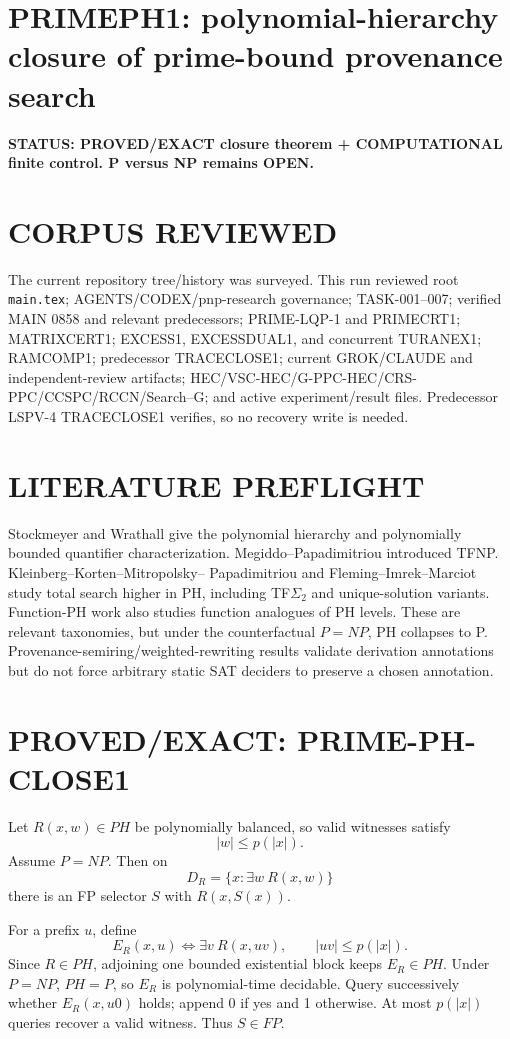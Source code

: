 \documentclass[11pt]{article}
\begin{document}
\section*{PRIMEPH1: polynomial-hierarchy closure of prime-bound provenance search}
\textbf{STATUS: PROVED/EXACT closure theorem + COMPUTATIONAL finite control. P versus NP remains OPEN.}

\section*{CORPUS REVIEWED}
The current repository tree/history was surveyed. This run reviewed root \texttt{main.tex};
AGENTS/CODEX/pnp-research governance; TASK-001--007; verified MAIN 0858 and relevant predecessors;
PRIME-LQP-1 and PRIMECRT1; MATRIXCERT1; EXCESS1, EXCESSDUAL1, and concurrent TURANEX1;
RAMCOMP1; predecessor TRACECLOSE1; current GROK/CLAUDE and independent-review artifacts;
HEC/VSC-HEC/G-PPC-HEC/CRS-PPC/CCSPC/RCCN/Search--G; and active experiment/result files.
Predecessor LSPV-4 TRACECLOSE1 verifies, so no recovery write is needed.

\section*{LITERATURE PREFLIGHT}
Stockmeyer and Wrathall give the polynomial hierarchy and polynomially bounded quantifier
characterization. Megiddo--Papadimitriou introduced TFNP. Kleinberg--Korten--Mitropolsky--
Papadimitriou and Fleming--Imrek--Marciot study total search higher in PH, including
TF\(\Sigma_2\) and unique-solution variants. Function-PH work also studies function analogues
of PH levels. These are relevant taxonomies, but under the counterfactual \(P=NP\), PH collapses
to P. Provenance-semiring/weighted-rewriting results validate derivation annotations but do not
force arbitrary static SAT deciders to preserve a chosen annotation.

\section*{PROVED/EXACT: PRIME-PH-CLOSE1}
Let \(R(x,w)\in PH\) be polynomially balanced, so valid witnesses satisfy
\[
|w|\le p(|x|).
\]
Assume \(P=NP\). Then on
\[
D_R=\{x:\exists w\ R(x,w)\}
\]
there is an FP selector \(S\) with \(R(x,S(x))\).

For a prefix \(u\), define
\[
E_R(x,u)\iff \exists v\ R(x,uv),\qquad |uv|\le p(|x|).
\]
Since \(R\in PH\), adjoining one bounded existential block keeps \(E_R\in PH\).
Under \(P=NP\), \(PH=P\), so \(E_R\) is polynomial-time decidable. Query successively
whether \(E_R(x,u0)\) holds; append 0 if yes and 1 otherwise. At most \(p(|x|)\) queries
recover a valid witness. Thus \(S\in FP\).
\end{document}
